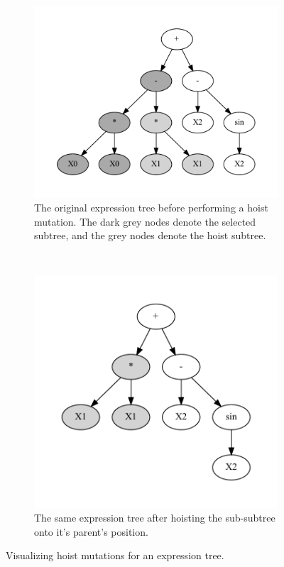 \begin{figure}[htp]
  \centering
  \begin{subfigure}{\textwidth}
    \centering
    \includegraphics[scale=0.8]{images/graphviz/hoist_mut_before.dot.pdf}
    \caption{The original expression tree before performing a hoist mutation. The dark grey nodes denote the selected subtree, and the grey nodes denote the hoist subtree.}
    \label{fig:hoist_muta}
  \end{subfigure}%
  \\
  \begin{subfigure}{\textwidth}
    \centering
    \includegraphics[scale=0.8]{images/graphviz/hoist_mut_after.dot.pdf}
    \caption{The same expression tree after hoisting the sub-subtree onto it's parent's position.}
    \label{fig:hoist_mutb}
  \end{subfigure}
  \caption{Visualizing hoist mutations for an expression tree.}
  
  \label{fig:hoist}
\end{figure}

